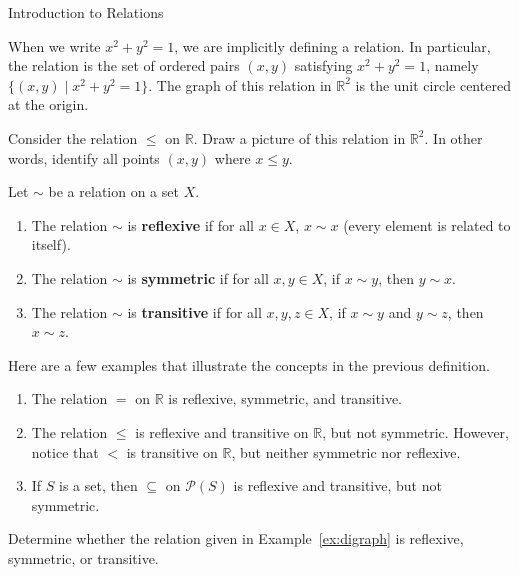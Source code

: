 \begin{section}{Introduction to Relations}
\begin{example}
When we write $x^2+y^2=1$, we are implicitly defining a relation.  In particular, the relation is the set of ordered pairs $(x,y)$ satisfying $x^2+y^2=1$, namely $\{(x,y)\mid x^2+y^2=1\}$. The graph of this relation in $\mathbb{R}^2$ is the unit circle centered at the origin.
\end{example}

\begin{problem}
Consider the relation $\leq$ on $\mathbb{R}$. Draw a picture of this relation in $\mathbb{R}^2$. In other words, identify all points $(x,y)$ where $x\leq y$.
\end{problem}

\begin{definition}
Let $\sim$ be a relation on a set $X$.
\begin{enumerate}[label=\textrm{(\alph*)}]
\item The relation $\sim$ is \textbf{reflexive} if for all $x\in X$, $x\sim x$ (every element is related to itself).
\item The relation $\sim$ is \textbf{symmetric} if for all $x,y\in X$, if $x\sim y$, then $y\sim x$.
\item The relation $\sim$ is \textbf{transitive} if for all $x,y,z\in X$, if $x\sim y$ and $y\sim z$, then $x\sim z$.
\end{enumerate}
\end{definition}

\begin{example}
Here are a few examples that illustrate the concepts in the previous definition.
\begin{enumerate}[label=\textrm{(\alph*)}]
\item The relation $=$ on $\mathbb{R}$ is reflexive, symmetric, and transitive.
\item The relation $\leq$ is reflexive and transitive on $\mathbb{R}$, but not symmetric. However, notice that $<$ is transitive on $\mathbb{R}$, but neither symmetric nor reflexive.
\item If $S$ is a set, then $\subseteq$ on $\mathcal{P}(S)$ is reflexive and transitive, but not symmetric.
\end{enumerate}
\end{example}

\begin{problem}
Determine whether the relation given in Example~\ref{ex:digraph} is reflexive, symmetric, or transitive.
\end{problem}


\end{section}
